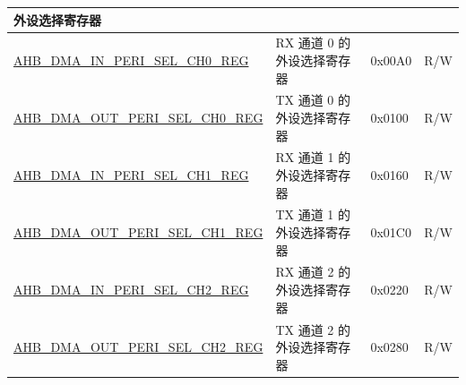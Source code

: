 \begin{longtable}{ | p{8cm} | p{8cm} | p{1.3cm} | p{1.5cm} | }
\multicolumn{4}{|l|}{\textbf{外设选择寄存器}} \\ \hline
\hyperref[regdesc:AHBDMAINPERISELCHNREG]{AHB\_DMA\_IN\_PERI\_SEL\_CH0\_REG} & RX 通道 0 的外设选择寄存器 & 0x00A0 & R/W \\ \hline
\hyperref[regdesc:AHBDMAOUTPERISELCHNREG]{AHB\_DMA\_OUT\_PERI\_SEL\_CH0\_REG} & TX 通道 0 的外设选择寄存器 & 0x0100 & R/W \\ \hline
\hyperref[regdesc:AHBDMAINPERISELCHNREG]{AHB\_DMA\_IN\_PERI\_SEL\_CH1\_REG} & RX 通道 1 的外设选择寄存器 & 0x0160 & R/W \\ \hline
\hyperref[regdesc:AHBDMAOUTPERISELCHNREG]{AHB\_DMA\_OUT\_PERI\_SEL\_CH1\_REG} & TX 通道 1 的外设选择寄存器 & 0x01C0 & R/W \\ \hline
\hyperref[regdesc:AHBDMAINPERISELCHNREG]{AHB\_DMA\_IN\_PERI\_SEL\_CH2\_REG} & RX 通道 2 的外设选择寄存器 & 0x0220 & R/W \\ \hline
\hyperref[regdesc:AHBDMAOUTPERISELCHNREG]{AHB\_DMA\_OUT\_PERI\_SEL\_CH2\_REG} & TX 通道 2 的外设选择寄存器 & 0x0280 & R/W \\ \hline
\end{longtable}
